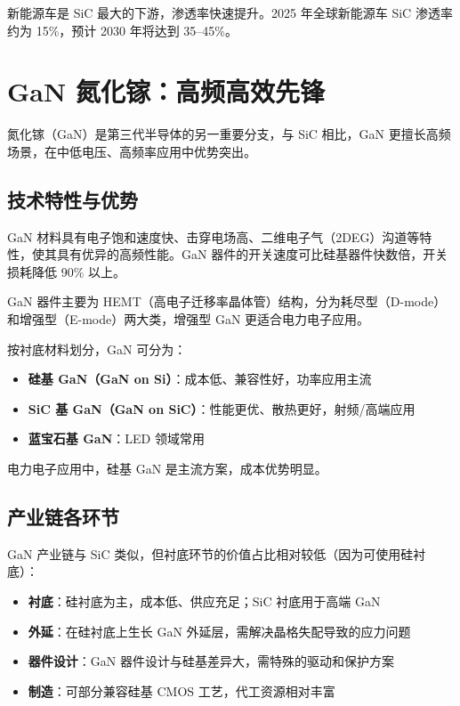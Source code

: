 新能源车是 SiC 最大的下游，渗透率快速提升。2025 年全球新能源车 SiC 渗透率约为 15\%，预计 2030 年将达到 35–45\%。

\section{GaN 氮化镓：高频高效先锋}

氮化镓（GaN）是第三代半导体的另一重要分支，与 SiC 相比，GaN 更擅长高频场景，在中低电压、高频率应用中优势突出。

\subsection{技术特性与优势}

GaN 材料具有电子饱和速度快、击穿电场高、二维电子气（2DEG）沟道等特性，使其具有优异的高频性能。GaN 器件的开关速度可比硅基器件快数倍，开关损耗降低 90\% 以上。

GaN 器件主要为 HEMT（高电子迁移率晶体管）结构，分为耗尽型（D-mode）和增强型（E-mode）两大类，增强型 GaN 更适合电力电子应用。

按衬底材料划分，GaN 可分为：
\begin{itemize}[leftmargin=2em]
\item \textbf{硅基 GaN（GaN on Si）}：成本低、兼容性好，功率应用主流
\item \textbf{SiC 基 GaN（GaN on SiC）}：性能更优、散热更好，射频/高端应用
\item \textbf{蓝宝石基 GaN}：LED 领域常用
\end{itemize}

电力电子应用中，硅基 GaN 是主流方案，成本优势明显。

\subsection{产业链各环节}

GaN 产业链与 SiC 类似，但衬底环节的价值占比相对较低（因为可使用硅衬底）：

\begin{itemize}[leftmargin=2em]
\item \textbf{衬底}：硅衬底为主，成本低、供应充足；SiC 衬底用于高端 GaN
\item \textbf{外延}：在硅衬底上生长 GaN 外延层，需解决晶格失配导致的应力问题
\item \textbf{器件设计}：GaN 器件设计与硅基差异大，需特殊的驱动和保护方案
\item \textbf{制造}：可部分兼容硅基 CMOS 工艺，代工资源相对丰富
\end{itemize}

